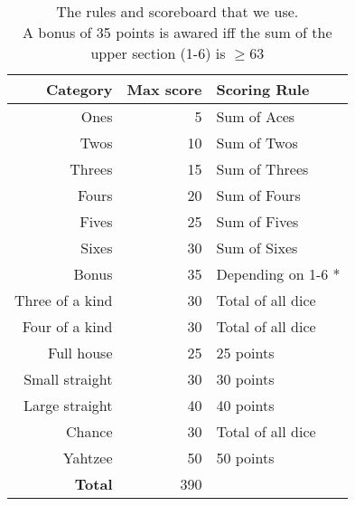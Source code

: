 \begin{table}
\centering
\begin{tabular}{|r|r|l|}
\hline
\textbf{Category} & \textbf{Max score} & \textbf{Scoring Rule} \\ \hline
Ones				&  5 & Sum of Aces 			\\ \hline
Twos				& 10 & Sum of Twos 			\\ \hline
Threes				& 15 & Sum of Threes 		\\ \hline
Fours				& 20 & Sum of Fours 		\\ \hline
Fives				& 25 & Sum of Fives 		\\ \hline
Sixes				& 30 & Sum of Sixes 		\\ \Xhline{3\arrayrulewidth}
Bonus				& 35 & Depending on 1-6 *	\\ \Xhline{3\arrayrulewidth}
Three of a kind		& 30 & Total of all dice 	\\ \hline
Four of a kind		& 30 & Total of all dice 	\\ \hline
Full house			& 25 & 25 points 			\\ \hline
Small straight		& 30 & 30 points 			\\ \hline
Large straight		& 40 & 40 points 			\\ \hline	
Chance				& 30 & Total of all dice 	\\ \hline	
Yahtzee				& 50 & 50 points 			\\ \Xhline{5\arrayrulewidth}
\textbf{Total}		& 390 &						\\ \hline
\end{tabular}
\caption{The rules and scoreboard that we use. \\
\textasteriskcentered A bonus of 35 points is awared iff the sum of the upper section (1-6) is $\ge 63$}
	\label{tab:rollout_cap_results}
\end{table}